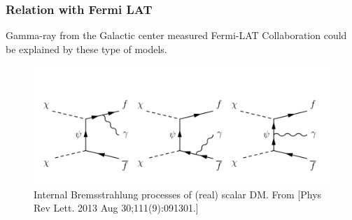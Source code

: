 \documentclass{beamer}
\begin{document}
\begin{frame}
\frametitle{Relation with Fermi LAT}

Gamma-ray from the Galactic center measured Fermi-LAT Collaboration could be explained by these type of models.

\begin{figure}
	\centering
	\includegraphics[scale=0.3]{pictures/Bremsstrahlung} 
	\caption{Internal Bremsstrahlung processes of (real) scalar DM. From [Phys Rev Lett. 2013 Aug 30;111(9):091301.] }
	\label{fig:Brem}
\end{figure}

\end{frame}
\end{document}
